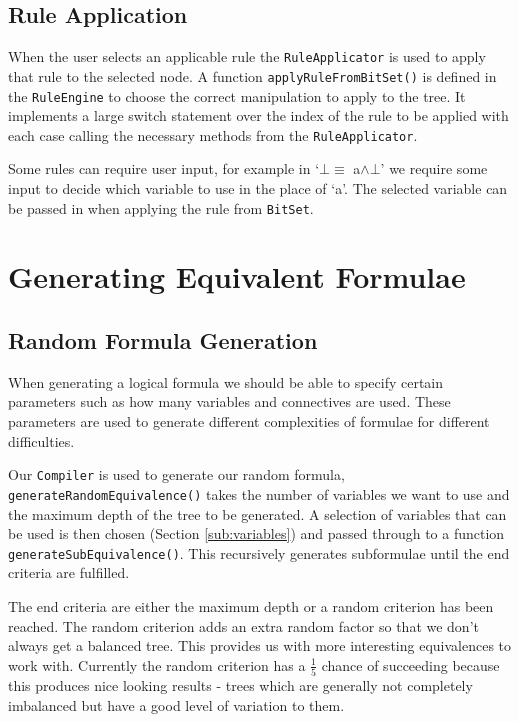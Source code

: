 \documentclass{report}
\begin{document}
\subsection{Rule Application}
\label{sub:rule_application}

When the user selects an applicable rule the {\tt RuleApplicator} is used to apply that rule to the selected node. A function {\tt applyRuleFromBitSet()} is defined in the {\tt RuleEngine} to choose the correct manipulation to apply to the tree. It implements a large switch statement over the index of the rule to be applied with each case calling the necessary methods from the {\tt RuleApplicator}.

Some rules can require user input, for example in `$\bot \equiv$ a$\land\bot$' we require some input to decide which variable to use in the place of `a'. The selected variable can be passed in when applying the rule from {\tt BitSet}.

\section{Generating Equivalent Formulae}

\subsection{Random Formula Generation}

When generating a logical formula we should be able to specify certain parameters such as how many variables and connectives are used. These parameters are used to generate different complexities of formulae for different difficulties.

Our {\tt Compiler} is used to generate our random formula, {\tt generateRandomEquivalence()} takes the number of variables we want to use and the maximum depth of the tree to be generated. A selection of variables that can be used is then chosen (Section \ref{sub:variables}) and passed through to a function {\tt generateSubEquivalence()}. This recursively generates subformulae until the end criteria are fulfilled.

The end criteria are either the maximum depth or a random criterion has been reached. The random criterion adds an extra random factor so that we don't always get a balanced tree. This provides us with more interesting equivalences to work with. Currently the random criterion has a $\frac{1}{5}$ chance of succeeding because this produces nice looking results - trees which are generally not completely imbalanced but have a good level of variation to them. 
\end{document}
